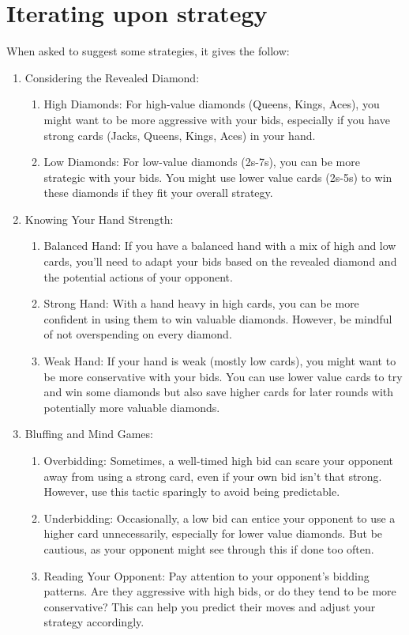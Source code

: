 \documentclass[a4paper,11pt,AutoFakeBold]{ctexart}
\begin{document}
\section{Iterating upon strategy} 
When asked to suggest some strategies, it gives the follow:
\begin{enumerate}
    \item Considering the Revealed Diamond: 
    \begin{enumerate} 
     \item High Diamonds: For high-value diamonds (Queens, Kings, Aces), you might want to be more aggressive with your bids, especially if you have strong cards (Jacks, Queens, Kings, Aces) in your hand.
    \item Low Diamonds: For low-value diamonds (2s-7s), you can be more strategic with your bids. You might use lower value cards (2s-5s) to win these diamonds if they fit your overall strategy.
    \end{enumerate}
    
    \item Knowing Your Hand Strength:
    \begin{enumerate} 
     \item Balanced Hand: If you have a balanced hand with a mix of high and low cards, you'll need to adapt your bids based on the revealed diamond and the potential actions of your opponent.
    \item Strong Hand: With a hand heavy in high cards, you can be more confident in using them to win valuable diamonds. However, be mindful of not overspending on every diamond.
    \item Weak Hand: If your hand is weak (mostly low cards), you might want to be more conservative with your bids. You can use lower value cards to try and win some diamonds but also save higher cards for later rounds with potentially more valuable diamonds.
    \end{enumerate}

    \item Bluffing and Mind Games:
    \begin{enumerate} 
     \item Overbidding: Sometimes, a well-timed high bid can scare your opponent away from using a strong card, even if your own bid isn't that strong. However, use this tactic sparingly to avoid being predictable.
    \item Underbidding: Occasionally, a low bid can entice your opponent to use a higher card unnecessarily, especially for lower value diamonds. But be cautious, as your opponent might see through this if done too often.
    \item Reading Your Opponent: Pay attention to your opponent's bidding patterns. Are they aggressive with high bids, or do they tend to be more conservative? This can help you predict their moves and adjust your strategy accordingly.
    \end{enumerate}


\end{enumerate}
\end{document}
